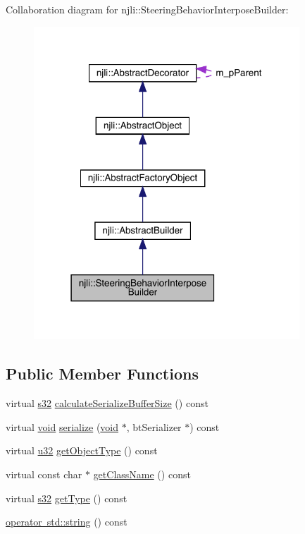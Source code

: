 Collaboration diagram for njli\+:\+:Steering\+Behavior\+Interpose\+Builder\+:\nopagebreak
\begin{figure}[H]
\begin{center}
\leavevmode
\includegraphics[width=283pt]{classnjli_1_1_steering_behavior_interpose_builder__coll__graph}
\end{center}
\end{figure}
\subsection*{Public Member Functions}
\begin{DoxyCompactItemize}
\item 
virtual \mbox{\hyperlink{_util_8h_aa62c75d314a0d1f37f79c4b73b2292e2}{s32}} \mbox{\hyperlink{classnjli_1_1_steering_behavior_interpose_builder_aa7089c006b41f518739b42c8a78a8b15}{calculate\+Serialize\+Buffer\+Size}} () const
\item 
virtual \mbox{\hyperlink{_thread_8h_af1e856da2e658414cb2456cb6f7ebc66}{void}} \mbox{\hyperlink{classnjli_1_1_steering_behavior_interpose_builder_a4927cfcb08181544485f060ea16620b8}{serialize}} (\mbox{\hyperlink{_thread_8h_af1e856da2e658414cb2456cb6f7ebc66}{void}} $\ast$, bt\+Serializer $\ast$) const
\item 
virtual \mbox{\hyperlink{_util_8h_a10e94b422ef0c20dcdec20d31a1f5049}{u32}} \mbox{\hyperlink{classnjli_1_1_steering_behavior_interpose_builder_a799a873e35c8a789604bd26428c21e62}{get\+Object\+Type}} () const
\item 
virtual const char $\ast$ \mbox{\hyperlink{classnjli_1_1_steering_behavior_interpose_builder_a4d5aca1336d985272b14bf3d79526fa8}{get\+Class\+Name}} () const
\item 
virtual \mbox{\hyperlink{_util_8h_aa62c75d314a0d1f37f79c4b73b2292e2}{s32}} \mbox{\hyperlink{classnjli_1_1_steering_behavior_interpose_builder_a9562aa01ebf6d4c86f248bb3e1b8b035}{get\+Type}} () const
\item 
\mbox{\hyperlink{classnjli_1_1_steering_behavior_interpose_builder_abf05e0eda6a4f1f235e1fa258c42fdf2}{operator std\+::string}} () const
\end{DoxyCompactItemize}
